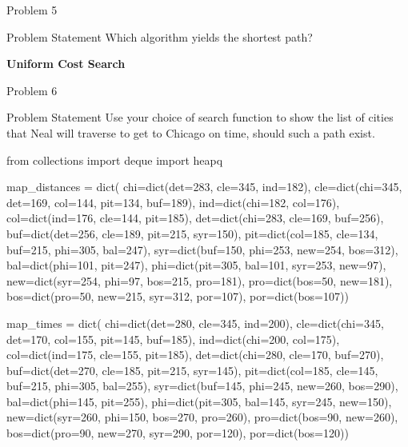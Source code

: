 \begin{problem}{Problem 5}
    \begin{statement}{Problem Statement}
        Which algorithm yields the shortest path?
    \end{statement}

    \begin{highlight}[Solution]
        \textbf{Uniform Cost Search}
    \end{highlight}
\end{problem}

\begin{problem}{Problem 6}
    \begin{statement}{Problem Statement}
        Use your choice of search function to show the list of cities that Neal will traverse to get to Chicago on time, should such a path exist.
    \end{statement}

    \begin{highlight}[Solution]
    \begin{code}[Python]
    from collections import deque
    import heapq
    
    map_distances = dict(
        chi=dict(det=283, cle=345, ind=182),
        cle=dict(chi=345, det=169, col=144, pit=134, buf=189),
        ind=dict(chi=182, col=176),
        col=dict(ind=176, cle=144, pit=185),
        det=dict(chi=283, cle=169, buf=256),
        buf=dict(det=256, cle=189, pit=215, syr=150),
        pit=dict(col=185, cle=134, buf=215, phi=305, bal=247),
        syr=dict(buf=150, phi=253, new=254, bos=312),
        bal=dict(phi=101, pit=247),
        phi=dict(pit=305, bal=101, syr=253, new=97),
        new=dict(syr=254, phi=97, bos=215, pro=181),
        pro=dict(bos=50, new=181),
        bos=dict(pro=50, new=215, syr=312, por=107),
        por=dict(bos=107))
    
    
    map_times = dict(
        chi=dict(det=280, cle=345, ind=200),
        cle=dict(chi=345, det=170, col=155, pit=145, buf=185),
        ind=dict(chi=200, col=175),
        col=dict(ind=175, cle=155, pit=185),
        det=dict(chi=280, cle=170, buf=270),
        buf=dict(det=270, cle=185, pit=215, syr=145),
        pit=dict(col=185, cle=145, buf=215, phi=305, bal=255),
        syr=dict(buf=145, phi=245, new=260, bos=290),
        bal=dict(phi=145, pit=255),
        phi=dict(pit=305, bal=145, syr=245, new=150),
        new=dict(syr=260, phi=150, bos=270, pro=260),
        pro=dict(bos=90, new=260),
        bos=dict(pro=90, new=270, syr=290, por=120),
        por=dict(bos=120))
    

\end{code}
\end{highlight}
\end{problem}
